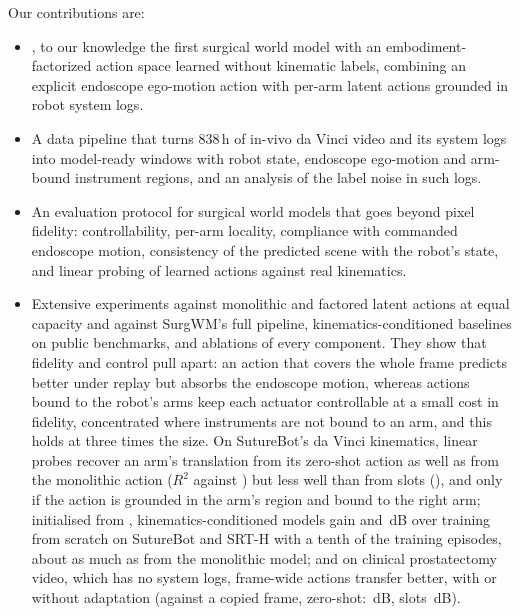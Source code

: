 Our contributions are:
\begin{itemize}
\item \method{}, to our knowledge the first surgical world model with an embodiment-factorized action space learned without kinematic labels, combining an explicit endoscope ego-motion action with per-arm latent actions grounded in robot system logs.
\item A data pipeline that turns 838\,h of in-vivo da Vinci video and its system logs into model-ready windows with robot state, endoscope ego-motion and arm-bound instrument regions, and an analysis of the label noise in such logs.
\item An evaluation protocol for surgical world models that goes beyond pixel fidelity: controllability, per-arm locality, compliance with commanded endoscope motion, consistency of the predicted scene with the robot's state, and linear probing of learned actions against real kinematics.
\item Extensive experiments against monolithic \cite{genie,surgwm} and factored \cite{flam} latent actions at equal capacity and against SurgWM's full pipeline, kinematics-conditioned baselines \cite{openh} on public benchmarks, and ablations of every component. They show that fidelity and control pull apart: an action that covers the whole frame predicts better under replay but absorbs the endoscope motion, whereas actions bound to the robot's arms keep each actuator controllable at a small cost in fidelity, concentrated where instruments are not bound to an arm, and this holds at three times the size. On SutureBot's da Vinci kinematics, linear probes recover an arm's translation from its zero-shot action as well as from the monolithic action ($R^2$  against ) but less well than from slots (), and only if the action is grounded in the arm's region and bound to the right arm; initialised from \method{}, kinematics-conditioned models gain  and \,dB over training from scratch on SutureBot and SRT-H with a tenth of the training episodes, about as much as from the monolithic model; and on clinical prostatectomy video, which has no system logs, frame-wide actions transfer better, with or without adaptation (against a copied frame, zero-shot: \method{} \,dB, slots \,dB).
\end{itemize}
